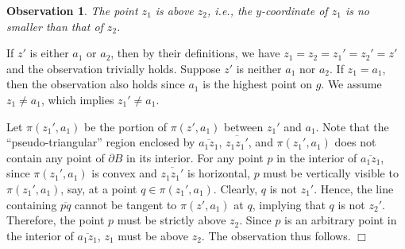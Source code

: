 \documentclass[english,runningheads,11pt]{llncs}
\newenvironment{proof}{\noindent {\textbf{Proof:}}\rm}{\hfill $\Box$\rm}
\newtheorem{observation}{Observation}
\begin{document}
\begin{observation}\label{obser:10}
The point $z_1$ is above $z_2$, i.e., the $y$-coordinate of $z_1$ is no smaller than that of $z_2$.
\end{observation}
\begin{proof}
If $z'$ is either $a_1$ or $a_2$, then by their definitions, we have $z_1=z_2=z_1'=z_2'=z'$ and
the observation trivially holds. Suppose $z'$ is neither $a_1$ nor $a_2$. If $z_1=a_1$, then
the observation also holds since $a_1$ is the highest point on $g$. We assume $z_1\neq a_1$,
which implies $z_1'\neq a_1$.

Let $\pi(z_1',a_1)$ be the portion of $\pi(z',a_1)$ between $z_1'$ and $a_1$. Note that the
``pseudo-triangular'' region enclosed by $\overline{a_1z_1}$, $\overline{z_1z_1'}$, and $\pi(z_1',a_1)$ does not contain any point of $\partial B$ in its interior.
For any point $p$ in the interior of $\overline{a_1z_1}$,
since $\pi(z_1',a_1)$ is convex and $\overline{z_1z_1'}$ is horizontal, $p$ must be vertically
visible to $\pi(z_1',a_1)$, say, at a point $q\in \pi(z_1',a_1)$. Clearly, $q$ is not $z_1'$.
Hence, the line containing $\overline{pq}$ cannot be tangent to $\pi(z',a_1)$ at $q$,
implying that $q$ is not $z_2'$. Therefore, the point $p$ must be strictly above $z_2$. Since $p$ is an arbitrary point in the interior of $\overline{a_1z_1}$, $z_1$ must be above $z_2$. The observation thus follows.
\end{proof}
\end{document}
